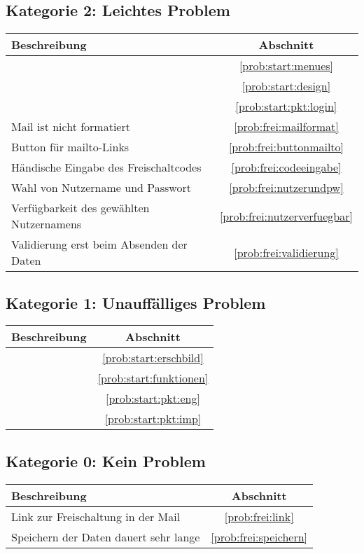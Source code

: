 \subsection*{Kategorie 2: Leichtes Problem}
\begin{tabular}{|p{12cm}|c|}
\hline
\textbf{Beschreibung} & \textbf{Abschnitt} \\
\hline\hline
\nameref{prob:start:menues} & \ref{prob:start:menues} \\
\nameref{prob:start:design} & \ref{prob:start:design} \\
\nameref{prob:start:pkt:login} & \ref{prob:start:pkt:login}\\
Mail ist nicht formatiert & \ref{prob:frei:mailformat}\\
Button für mailto-Links & \ref{prob:frei:buttonmailto}\\
Händische Eingabe des Freischaltcodes & \ref{prob:frei:codeeingabe}\\
Wahl von Nutzername und Passwort & \ref{prob:frei:nutzerundpw}\\
Verfügbarkeit des gewählten Nutzernamens & \ref{prob:frei:nutzerverfuegbar}\\
Validierung erst beim Absenden der Daten & \ref{prob:frei:validierung}\\
\hline

\end{tabular}

\subsection*{Kategorie 1: Unauffälliges Problem}
\begin{tabular}{|p{12cm}|c|}
\hline
\textbf{Beschreibung} & \textbf{Abschnitt} \\
\hline\hline
\nameref{prob:start:erschbild} & \ref{prob:start:erschbild}\\
\nameref{prob:start:funktionen} & \ref{prob:start:funktionen}\\
\nameref{prob:start:pkt:eng} & \ref{prob:start:pkt:eng}\\
\nameref{prob:start:pkt:imp} & \ref{prob:start:pkt:imp}\\
\hline
\end{tabular}

\subsection*{Kategorie 0: Kein Problem}
\begin{tabular}{|p{12cm}|c|}
\hline
\textbf{Beschreibung} & \textbf{Abschnitt} \\
\hline\hline
Link zur Freischaltung in der Mail & \ref{prob:frei:link}\\
Speichern der Daten dauert sehr lange & \ref{prob:frei:speichern}\\
\hline
\end{tabular}
